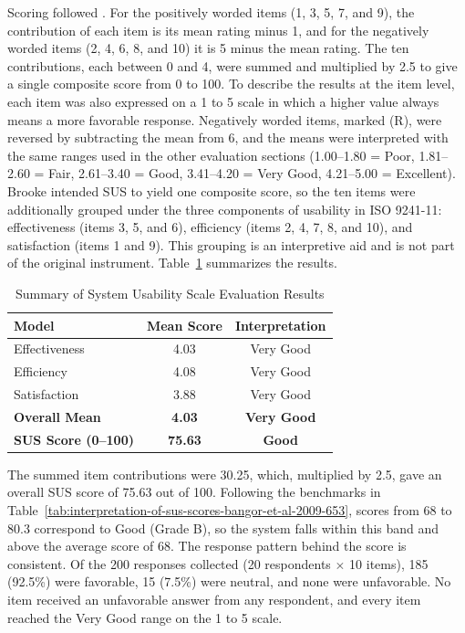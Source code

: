 \begin{thesisprose}
Scoring followed \citet{brooke1996}. For the positively worded items (1, 3, 5, 7, and 9), the contribution of each item is its mean rating minus 1, and for the negatively worded items (2, 4, 6, 8, and 10) it is 5 minus the mean rating. The ten contributions, each between 0 and 4, were summed and multiplied by 2.5 to give a single composite score from 0 to 100. To describe the results at the item level, each item was also expressed on a 1 to 5 scale in which a higher value always means a more favorable response. Negatively worded items, marked (R), were reversed by subtracting the mean from 6, and the means were interpreted with the same ranges used in the other evaluation sections (1.00--1.80 = Poor, 1.81--2.60 = Fair, 2.61--3.40 = Good, 3.41--4.20 = Very Good, 4.21--5.00 = Excellent). Brooke intended SUS to yield one composite score, so the ten items were additionally grouped under the three components of usability in ISO 9241-11: effectiveness (items 3, 5, and 6), efficiency (items 2, 4, 7, 8, and 10), and satisfaction (items 1 and 9). This grouping is an interpretive aid and is not part of the original instrument. Table~\ref{tab:sus-summary} summarizes the results.

\begin{table}[htbp]
\centering
\caption{Summary of System Usability Scale Evaluation Results}
\label{tab:sus-summary}
\begin{tabular}{lcc}
\toprule
\textbf{Model} & \textbf{Mean Score} & \textbf{Interpretation} \\
\midrule
Effectiveness & 4.03 & Very Good \\
Efficiency & 4.08 & Very Good \\
Satisfaction & 3.88 & Very Good \\
\midrule
\textbf{Overall Mean} & \textbf{4.03} & \textbf{Very Good} \\
\midrule
\textbf{SUS Score (0--100)} & \textbf{75.63} & \textbf{Good} \\
\bottomrule
\end{tabular}
\end{table}

The summed item contributions were 30.25, which, multiplied by 2.5, gave an overall SUS score of 75.63 out of 100. Following the benchmarks in Table~\ref{tab:interpretation-of-sus-scores-bangor-et-al-2009-653}, scores from 68 to 80.3 correspond to Good (Grade B), so the system falls within this band and above the average score of 68. The response pattern behind the score is consistent. Of the 200 responses collected (20 respondents $\times$ 10 items), 185 (92.5\%) were favorable, 15 (7.5\%) were neutral, and none were unfavorable. No item received an unfavorable answer from any respondent, and every item reached the Very Good range on the 1 to 5 scale.


\end{thesisprose}
